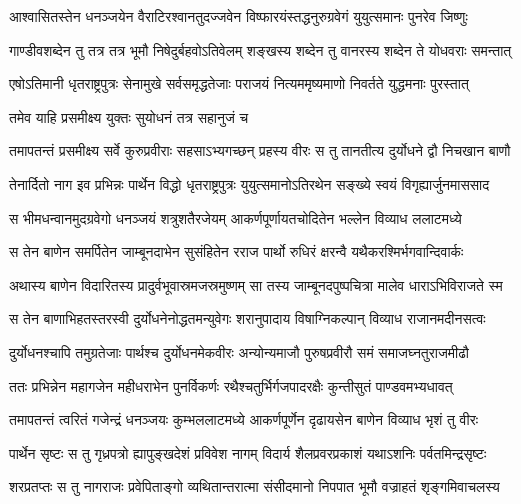 \fourlineindentedshloka
{आश्वासितस्तेन धनञ्जयेन}
{वैराटिरश्वानतुदज्जवेन}
{विष्फारयंस्तद्धनुरुग्रवेगं}
{युयुत्समानः पुनरेव जिष्णुः}


\fourlineindentedshloka
{गाण्डीवशब्देन तु तत्र तत्र}
{भूमौ निषेदुर्बहवोऽतिवेलम्}
{शङ्खस्य शब्देन तु वानरस्य}
{शब्देन ते योधवराः समन्तात्}



\fourlineindentedshloka
{एषोऽतिमानी धृतराष्ट्रपुत्रः}
{सेनामुखे सर्वसमृद्धतेजाः}
{पराजयं नित्यममृष्यमाणो}
{निवर्तते युद्धमनाः पुरस्तात्}


\onelineindentedshloka
{तमेव याहि प्रसमीक्ष्य युक्तः}
{सुयोधनं तत्र सहानुजं च}



\fourlineindentedshloka
{तमापतन्तं प्रसमीक्ष्य सर्वे}
{कुरुप्रवीराः सहसाऽभ्यगच्छन्}
{प्रहस्य वीरः स तु तानतीत्य}
{दुर्योधने द्वौ निचखान बाणौ}


\fourlineindentedshloka
{तेनार्दितो नाग इव प्रभिन्नः}
{पार्थेन विद्धो धृतराष्ट्रपुत्रः}
{युयुत्समानोऽतिरथेन सङ्ख्ये}
{स्वयं विगृह्यार्जुनमाससाद}


\fourlineindentedshloka
{स भीमधन्वानमुदग्रवेगो}
{धनञ्जयं शत्रुशतैरजेयम्}
{आकर्णपूर्णायतचोदितेन}
{भल्लेन विव्याध ललाटमध्ये}


\fourlineindentedshloka
{स तेन बाणेन समर्पितेन}
{जाम्बूनदाभेन सुसंहितेन}
{रराज पार्थो रुधिरं क्षरन्वै}
{यथैकरश्मिर्भगवान्दिवार्कः}


\fourlineindentedshloka
{अथास्य बाणेन विदारितस्य}
{प्रादुर्वभूवास्रमजस्रमुष्णम्}
{सा तस्य जाम्बूनदपुष्पचित्रा}
{मालेव धाराऽभिविराजते स्म}


\fourlineindentedshloka
{स तेन बाणाभिहतस्तरस्वी}
{दुर्योधनेनोद्धतमन्युवेगः}
{शरानुपादाय विषाग्निकल्पान्}
{विव्याध राजानमदीनसत्वः}


\fourlineindentedshloka
{दुर्योधनश्चापि तमुग्रतेजाः}
{पार्थश्च दुर्योधनमेकवीरः}
{अन्योन्यमाजौ पुरुषप्रवीरौ}
{समं समाजघ्नतुराजमीढौ}


\fourlineindentedshloka
{ततः प्रभिन्नेन महागजेन}
{महीधराभेन पुनर्विकर्णः}
{रथैश्चतुर्भिर्गजपादरक्षैः}
{कुन्तीसुतं पाण्डवमभ्यधावत्}


\fourlineindentedshloka
{तमापतन्तं त्वरितं गजेन्द्रं}
{धनञ्जयः कुम्भललाटमध्ये}
{आकर्णपूर्णेन दृढायसेन}
{बाणेन विव्याध भृशं तु वीरः}


\fourlineindentedshloka
{पार्थेन सृष्टः स तु गृध्रपत्रो}
{ह्यापुङ्खदेशं प्रविवेश नागम्}
{विदार्य शैलप्रवरप्रकाशं}
{यथाऽशनिः पर्वतमिन्द्रसृष्टः}


\fourlineindentedshloka
{शरप्रतप्तः स तु नागराजः}
{प्रवेपिताङ्गो व्यथितान्तरात्मा}
{संसीदमानो निपपात भूमौ}
{वज्राहतं शृङ्गमिवाचलस्य}


